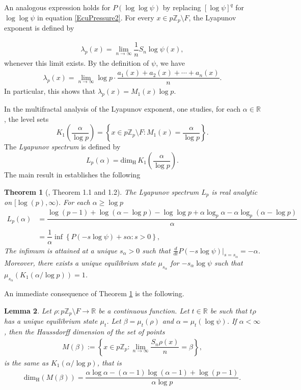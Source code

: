\documentclass[11pt]{amsart}
\newtheorem{theorem}{Theorem}[section]
\newtheorem{lemma}[theorem]{Lemma}
\theoremstyle{remark}
\numberwithin{equation}{section}
\newcommand{\R}{\mathbb{R}}
\newcommand{\Z}{\mathbb{Z}}
\newcommand{\dimH}{\mathrm{dim}_{\mathrm{H}}}
\begin{document}
An analogous expression holds for $P(\log\log \psi)$ by replacing $[\log \psi]^{q}$ for $\log\log \psi$ in equation \eqref{EcuPressure2}. 
For every $x\in p\Z_p \setminus F$, the Lyapunov exponent is defined by

\begin{align*}
     \lambda_{p}(x)=\lim_{n\rightarrow{\infty}}\dfrac{1}{n}S_{n}\log\psi (x),
\end{align*} 
whenever this limit exists.  By the definition of $\psi$, we have 
\begin{align}
    \lambda_{p}(x)=\lim_{n\rightarrow{\infty}}\log p \cdot \dfrac{a_{1}(x)+a_{2}(x)+\cdots +a_{n}(x)}{n}.
\end{align} 
In particular, this shows that $\lambda_{p}(x)=M_{1}(x)\log p$. 

In the multifractal analysis of the Lyapunov exponent, one studies, for each $\alpha\in \R$, the level sets \[K_{1}\left(\frac{\alpha}{\log p}\right)=\left\{x\in p\Z_{p}\setminus F: M_{1}(x)=\frac{\alpha}{\log p}\right\}.\] The \textit{Lyapunov spectrum} is defined by \[L_{p}(\alpha)=\mathrm{dim}_{\mathrm{H}}\,K_{1}\left(\frac{\alpha}{\log p}\right).\] %
The main result in \cite{paper1} establishes the following 
\begin{theorem}[\cite{paper1}, Theorem 1.1 and 1.2]\label{Theorem Paper 1}
      The Lyapunov spectrum $L_{p}$ is real analytic on $[\log(p),\infty)$. For each $\alpha\geq  \log p$
      \begin{align}\label{EcuSInCalculoExplicito}
        L_{p}(\alpha)&=\dfrac{\log(p-1)+\log(\alpha-\log p)-\log\log p+\alpha\log_{p} \alpha-\alpha\log_{p}(\alpha-\log p)}{\alpha}\\&=\dfrac{1}{\alpha}\inf\left\{P(-s\log \psi)+s\alpha:s>0\right\},
    \end{align} The infimum is attained at a unique $s_{\alpha}>0$ such that $\frac{d}{dt}P(-s\log \psi)|_{s=s_{\alpha}}=-\alpha$. Moreover, there exists a unique equilibrium state $\mu_{s_{\alpha}}$ for $-s_{\alpha}\log \psi$ such that $\mu_{s_{\alpha}}(K_{1}(\alpha/\log p))=1$.
\end{theorem}
An immediate consequence of Theorem \ref{Theorem Paper 1} is the following.
\begin{lemma}\label{Corollary 1}
    Let $\rho:p\Z_{p}\setminus F\to\mathbb{R}$ be a continuous function. Let $t\in \R$ be such that $t\rho$ has a unique equilibrium state $\mu_{t}$. Let $\beta=\mu_{t}(\rho)$ and $\alpha=\mu_{t}(\log \psi)$. If $\alpha<\infty$, then the Haussdorff dimension of the set of points
    \begin{align*}
        M(\beta):=\left\{x\in p\Z_{p}:\lim_{n\to\infty}\dfrac{S_{n}\rho(x)}{n}=\beta\right\},
    \end{align*}is the same as $K_{1}(\alpha/\log p)$, that is
    \begin{align*}
        \dimH(M(\beta))=\dfrac{\alpha\log\alpha-(\alpha-1)\log(\alpha-1)+\log(p-1)}{\alpha \log p}.
    \end{align*}
\end{lemma}
\end{document}
